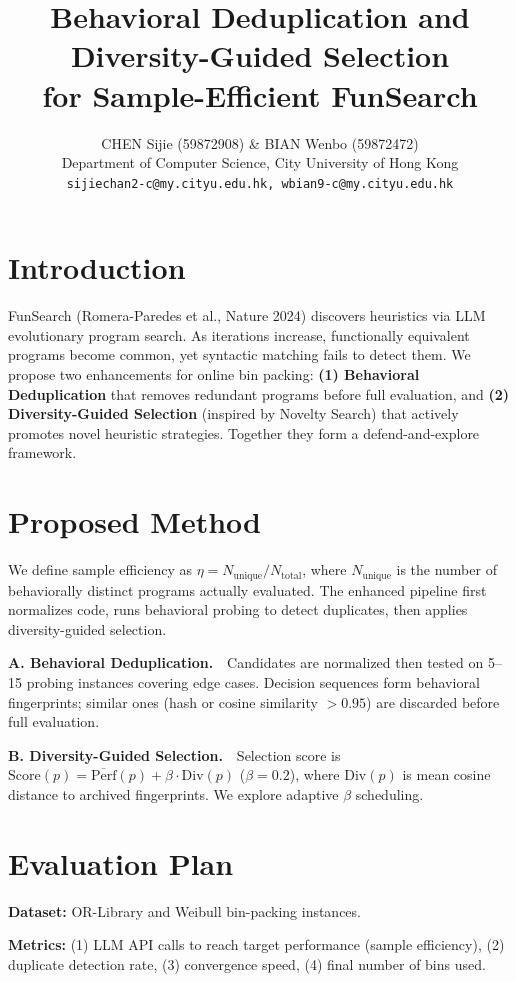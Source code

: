 \documentclass{article}
\title{Behavioral Deduplication and Diversity-Guided Selection\\for Sample-Efficient FunSearch}
\author{CHEN Sijie (59872908) \& BIAN Wenbo (59872472) \\
Department of Computer Science, City University of Hong Kong \\
\texttt{sijiechan2-c@my.cityu.edu.hk, wbian9-c@my.cityu.edu.hk}}
\begin{document}
\maketitle
\small

\section{Introduction}
FunSearch (Romera-Paredes et al., Nature 2024) discovers heuristics via LLM evolutionary program search. As iterations increase, functionally equivalent programs become common, yet syntactic matching fails to detect them. We propose two enhancements for online bin packing: \textbf{(1) Behavioral Deduplication} that removes redundant programs before full evaluation, and \textbf{(2) Diversity-Guided Selection} (inspired by Novelty Search) that actively promotes novel heuristic strategies. Together they form a defend-and-explore framework.

\section{Proposed Method}
We define sample efficiency as $\eta = N_{\text{unique}}/N_{\text{total}}$, where $N_{\text{unique}}$ is the number of behaviorally distinct programs actually evaluated. The enhanced pipeline first normalizes code, runs behavioral probing to detect duplicates, then applies diversity-guided selection.

\textbf{A. Behavioral Deduplication.}~~Candidates are normalized then tested on 5--15 probing instances covering edge cases. Decision sequences form behavioral fingerprints; similar ones (hash or cosine similarity $>0.95$) are discarded before full evaluation.

\textbf{B. Diversity-Guided Selection.}~~Selection score is $\mathrm{Score}(p)=\overline{\mathrm{Perf}}(p)+\beta\cdot\mathrm{Div}(p)$ ($\beta=0.2$), where $\mathrm{Div}(p)$ is mean cosine distance to archived fingerprints. We explore adaptive $\beta$ scheduling.

\section{Evaluation Plan}
\textbf{Dataset:} OR-Library and Weibull bin-packing instances.

\textbf{Metrics:} (1) LLM API calls to reach target performance (sample efficiency), (2) duplicate detection rate, (3) convergence speed, (4) final number of bins used.
\end{document}
